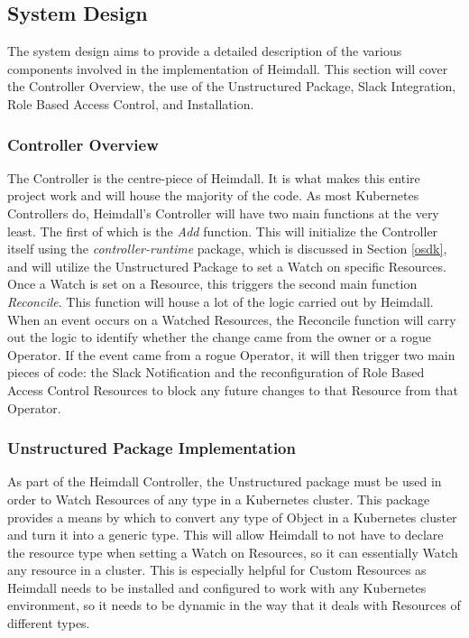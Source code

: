 \documentclass{article}
\begin{document}
\subsection{System Design} \label{design-desc}

The system design aims to provide a detailed description of the various components involved in the implementation of Heimdall. This section will cover the Controller Overview, the use of the Unstructured Package, Slack Integration, Role Based Access Control, and Installation. 

\subsubsection{Controller Overview}

The Controller is the centre-piece of Heimdall. It is what makes this entire project work and will house the majority of the code. As most Kubernetes Controllers do, Heimdall's Controller will have two main functions at the very least. The first of which is the \emph{Add} function. This will initialize the Controller itself using the \emph{controller-runtime} package, which is discussed in Section \ref{osdk}, and will utilize the Unstructured Package to set a Watch on specific Resources. Once a Watch is set on a Resource, this triggers the second main function \emph{Reconcile}. This function will house a lot of the logic carried out by Heimdall. When an event occurs on a Watched Resources, the Reconcile function will carry out the logic to identify whether the change came from the owner or a rogue Operator. If the event came from a rogue Operator, it will then trigger two main pieces of code: the Slack Notification and the reconfiguration of Role Based Access Control Resources to block any future changes to that Resource from that Operator.

\subsubsection{Unstructured Package Implementation}

As part of the Heimdall Controller, the Unstructured package must be used in order to Watch Resources of any type in a Kubernetes cluster. This package provides a means by which to convert any type of Object in a Kubernetes cluster and turn it into a generic type. This will allow Heimdall to not have to declare the resource type when setting a Watch on Resources, so it can essentially Watch any resource in a cluster. This is especially helpful for Custom Resources as Heimdall needs to be installed and configured to work with any Kubernetes environment, so it needs to be dynamic in the way that it deals with Resources of different types.
\end{document}
